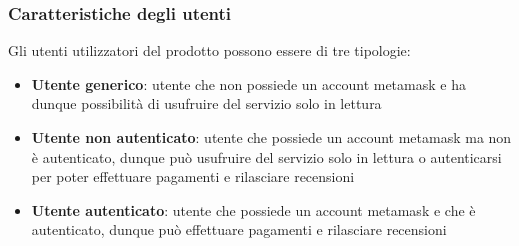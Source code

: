     \subsubsection{Caratteristiche degli utenti}
    Gli utenti utilizzatori del prodotto possono essere di tre tipologie:
    \begin{itemize}
        \item \textbf{Utente generico}: utente che non possiede un account metamask e ha dunque possibilità di usufruire del servizio solo in lettura
        \item \textbf{Utente non autenticato}: utente che possiede un account metamask ma non è autenticato, dunque può usufruire del servizio solo in lettura o autenticarsi per poter effettuare pagamenti e rilasciare recensioni
        \item \textbf{Utente autenticato}: utente che possiede un account metamask e che è autenticato, dunque può effettuare pagamenti e rilasciare recensioni
    \end{itemize}

